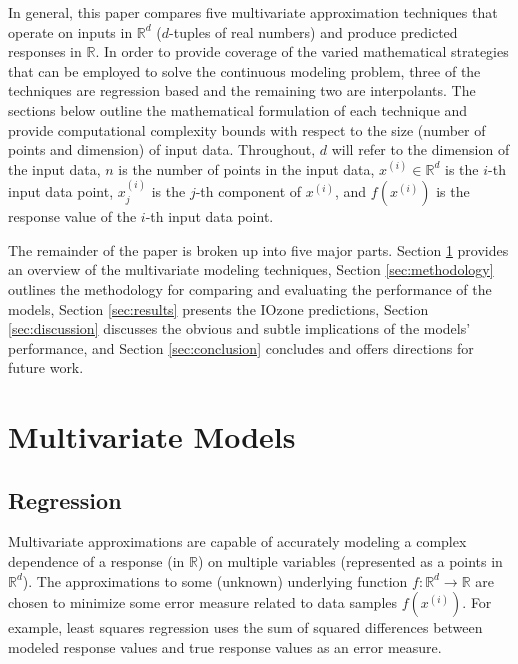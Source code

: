 \documentclass{scspaperproc}
\theoremstyle{scsthe}
\begin{document}


In general, this paper compares five multivariate approximation
techniques that operate on inputs in $\mathbb{R}^d$ ($d$-tuples of
real numbers) and produce predicted responses in $\mathbb{R}$. In
order to provide coverage of the varied mathematical strategies that
can be employed to solve the continuous modeling problem, three of the
techniques are regression based and the remaining two are
interpolants. The sections below outline the mathematical formulation
of each technique and provide computational complexity bounds with
respect to the size (number of points and dimension) of input
data. Throughout, $d$ will refer to the dimension of the input data,
$n$ is the number of points in the input data, $x^{(i)} \in
\mathbb{R}^d$ is the $i$-th input data point, $x^{(i)}_j$ is the
$j$-th component of $x^{(i)}$, and $f(x^{(i)})$ is the response value
of the $i$-th input data point.

The remainder of the paper is broken up into five major parts. Section
\ref{sec:multivariate} provides an overview of the multivariate
modeling techniques, Section \ref{sec:methodology} outlines the
methodology for comparing and evaluating the performance of the
models, Section \ref{sec:results} presents the IOzone predictions,
Section \ref{sec:discussion} discusses the obvious and subtle
implications of the models' performance, and Section
\ref{sec:conclusion} concludes and offers directions for future work.

\section{Multivariate Models}
\label{sec:multivariate}

\subsection{Regression}
\vspace{-10pt}
Multivariate approximations are capable of accurately modeling a
complex dependence of a response (in $\mathbb{R}$) on multiple
variables (represented as a points in $\mathbb{R}^{d}$). The
approximations to some (unknown) underlying function $f: \mathbb{R}^d
\rightarrow \mathbb{R}$ are chosen to minimize some error measure
related to data samples $f(x^{(i)})$. For example, least squares
regression uses the sum of squared differences between modeled
response values and true response values as an error measure.
\end{document}

